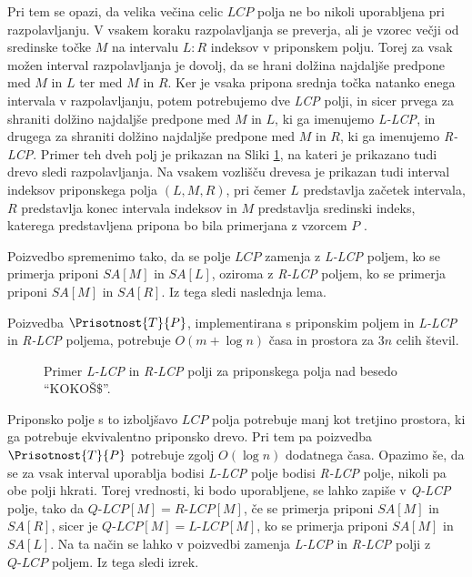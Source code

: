 Pri tem se opazi, da velika večina celic $LCP$ polja ne bo nikoli uporabljena pri razpolavljanju. V vsakem koraku razpolavljanja se preverja, ali je vzorec večji od sredinske točke $M$ na intervalu $L:R$ indeksov v priponskem polju. Torej za vsak možen interval razpolavljanja je dovolj, da se hrani dolžina najdaljše predpone med $M$ in $L$ ter med $M$ in $R$. Ker je vsaka pripona srednja točka natanko enega intervala v razpolavljanju, potem potrebujemo dve \textit{LCP} polji, in sicer prvega za shraniti dolžino najdaljše predpone med $M$ in $L$, ki ga imenujemo \textit{L-LCP}, in drugega za shraniti dolžino najdaljše predpone med $M$ in $R$, ki ga imenujemo \textit{R-LCP}. Primer teh dveh polj je prikazan na Sliki \ref{fig:RlcpLlcpSuffuxArray}, na kateri je prikazano tudi drevo sledi razpolavljanja. Na vsakem vozlišču drevesa je prikazan tudi interval indeksov priponskega polja $(L,M,R)$, pri čemer $L$ predstavlja začetek intervala, $R$ predstavlja konec intervala indeksov in $M$ predstavlja sredinski indeks, katerega predstavljena pripona bo bila primerjana z vzorcem $P$ \cite{Manber1990}. 

Poizvedbo spremenimo tako, da se polje $LCP$ zamenja z \textit{L-LCP} poljem, ko se primerja priponi $SA[M]$ in $SA[L]$, oziroma z \textit{R-LCP} poljem, ko se primerja priponi $SA[M]$ in $SA[R]$. Iz tega sledi naslednja lema.

\begin{lema}\label{lema:LRLCP}
    Poizvedba $\Prisotnost{T}{P}$, implementirana s priponskim poljem in \textit{L-LCP} in \textit{R-LCP} poljema, potrebuje $O(m+\log{n})$ časa in prostora za $3n$ celih števil.
\end{lema}

\begin{figure}[tb] 
    
    \centering
    \caption{Primer \textit{L-LCP} in \textit{R-LCP} polji za priponskega polja nad besedo \enquote{KOKOŠ$\$$}.} 
    \label{fig:RlcpLlcpSuffuxArray}
\end{figure}

Priponsko polje s to izboljšavo $LCP$ polja potrebuje manj kot tretjino prostora, ki ga potrebuje ekvivalentno priponsko drevo. Pri tem pa poizvedba $\Prisotnost{T}{P}$ potrebuje zgolj $O(\log{n})$ dodatnega časa. Opazimo še, da se za vsak interval uporablja bodisi \textit{L-LCP} polje bodisi \textit{R-LCP} polje, nikoli pa obe polji hkrati. Torej vrednosti, ki bodo uporabljene, se lahko zapiše v \textit{Q-LCP} polje, tako da $\textit{Q-LCP}[M]= \textit{R-LCP}[M]$, če se primerja priponi $SA[M]$ in $SA[R]$, sicer je $\textit{Q-LCP}[M]= \textit{L-LCP}[M]$, ko se primerja priponi $SA[M]$ in $SA[L]$. Na ta način se lahko v poizvedbi zamenja \textit{L-LCP} in \textit{R-LCP} polji z $\textit{Q-LCP}$ poljem. Iz tega sledi izrek.

